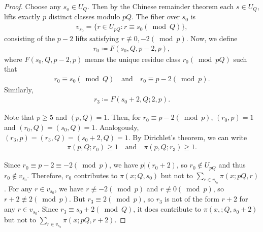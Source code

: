 \documentclass[10pt,a4paper]{amsart}
\begin{document}
\begin{proof}
Choose any $s_o\in U_Q$. Then by the Chinese remainder theorem each $s\in U_Q$, lifts exactly $p$ distinct classes modulo $pQ$. The fiber over $s_0$ is
\begin{align*}
v_{s_0}
=\{r\in U_{pQ}:r\equiv s_0(\bmod{Q})\},
\end{align*}
consisting of the $p-2$ lifts satisfying $r\not\equiv0,-2(\bmod{p})$. Now, we define
\begin{align*}
r_0
\coloneqq F(s_0,Q,p-2,p),
\end{align*}
where $F(s_0,Q,p-2,p)$ means the unique residue class $r_0(\bmod{pQ})$ such that
\begin{align*}
r_0\equiv s_0(\bmod{Q})\quad\text{and}\quad r_0\equiv p-2(\bmod{p}).    
\end{align*}
Similarly, 
\begin{align*}
r_3
\coloneqq F(s_0+2,Q;2,p).
\end{align*}

\noindent
Note that $p\geq5$ and $(p,Q)=1$. Then, for $r_0\equiv p-2(\bmod{p})$, $(r_0,p)=1$ and $(r_0,Q)=(s_0,Q)=1$. Analogously, $(r_3,p)=(r_3,Q)=(s_0+2,Q)=1$. By Dirichlet's theorem, we can write
\begin{align*}
\pi(p,Q;r_0)\geq 1\quad\text{and}\quad
\pi(p,Q;r_3)\geq 1.
\end{align*}

\noindent
Since $r_0\equiv p-2\equiv -2(\bmod{p})$, we have $p|(r_0+2)$, so $r_0\notin U_{pQ}$ and thus $r_0\notin v_{s_0}$. Therefore, $r_0$ contributes to $\pi(x;Q,s_0)$ but not to $\sum_{r\in v_{s_0}}\pi(x;pQ,r)$. For any $r\in v_{s_0}$, we have $r \not\equiv -2(\bmod{p})$ and $r\not\equiv 0(\bmod{p})$, 
so $r+2\not\equiv 2(\bmod{p})$. But $r_3\equiv 2(\bmod{p})$, so $r_3$ is not of the form $r+2$ for any $r\in v_{s_0}$. Since $r_3 \equiv s_0+2(\bmod{Q})$, it does contribute to $\pi(x,;Q,s_0+2)$ but not to $\sum_{r\in v_{s_0}}\pi(x;pQ,r+2)$. 


\end{proof}
\end{document}
